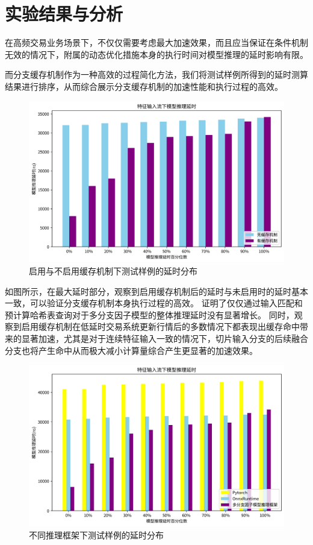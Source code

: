 \section{实验结果与分析}
在高频交易业务场景下，不仅仅需要考虑最大加速效果，而且应当保证在条件机制无效的情况下，附属的动态优化措施本身的执行时间对模型推理的延时影响有限。

而分支缓存机制作为一种高效的过程简化方法，我们将测试样例所得到的延时测算结果进行排序，从而综合展示分支缓存机制的加速性能和执行过程的高效。

\begin{figure}[h]
    \centering
    \includegraphics[width=1\textwidth]{image/chap04/outstime.png}
    \caption{启用与不启用缓存机制下测试样例的延时分布}
    \label{fig:hole}
\end{figure}

如图所示，在最大延时部分，观察到启用缓存机制后的延时与未启用时的延时基本一致，可以验证分支缓存机制本身执行过程的高效。
证明了仅仅通过输入匹配和预计算哈希表查询对于多分支因子模型的整体推理延时没有显著增长。
同时，观察到启用缓存机制在低延时交易系统更新行情后的多数情况下都表现出缓存命中带来的显著加速，尤其是对于连续特征输入一致的情况下，切片输入分支的后续融合分支也将产生命中从而极大减小计算量综合产生更显著的加速效果。

\begin{figure}[h]
    \centering
    \includegraphics[width=1\textwidth]{image/chap04/outsframe.png}
    \caption{不同推理框架下测试样例的延时分布}
    \label{fig:hole}
\end{figure}

